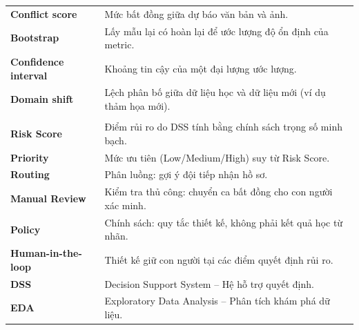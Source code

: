 \begin{longtable}{>{\bfseries}p{3.4cm}p{10.8cm}}
Conflict score & Mức bất đồng giữa dự báo văn bản và ảnh.\\
Bootstrap & Lấy mẫu lại có hoàn lại để ước lượng độ ổn định của metric.\\
Confidence interval & Khoảng tin cậy của một đại lượng ước lượng.\\
Domain shift & Lệch phân bố giữa dữ liệu học và dữ liệu mới (ví dụ thảm họa mới).\\
\midrule
\multicolumn{2}{l}{\textit{\textbf{Tầng quyết định}}}\\
Risk Score & Điểm rủi ro do DSS tính bằng chính sách trọng số minh bạch.\\
Priority & Mức ưu tiên (Low/Medium/High) suy từ Risk Score.\\
Routing & Phân luồng: gợi ý đội tiếp nhận hồ sơ.\\
Manual Review & Kiểm tra thủ công: chuyển ca bất đồng cho con người xác minh.\\
Policy & Chính sách: quy tắc thiết kế, không phải kết quả học từ nhãn.\\
Human-in-the-loop & Thiết kế giữ con người tại các điểm quyết định rủi ro.\\
DSS & Decision Support System -- Hệ hỗ trợ quyết định.\\
EDA & Exploratory Data Analysis -- Phân tích khám phá dữ liệu.\\
\bottomrule
\end{longtable}
